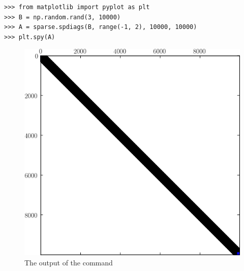 \begin{lstlisting}
>>> from matplotlib import pyplot as plt
>>> B = np.random.rand(3, 10000)
>>> A = sparse.spdiags(B, range(-1, 2), 10000, 10000)
>>> plt.spy(A)
\end{lstlisting}

\begin{figure}
\centering
\includegraphics[width=.75\textwidth]{spy.png}
\caption{The output of the  command}
\label{fig:mpl_spy}
\end{figure}

